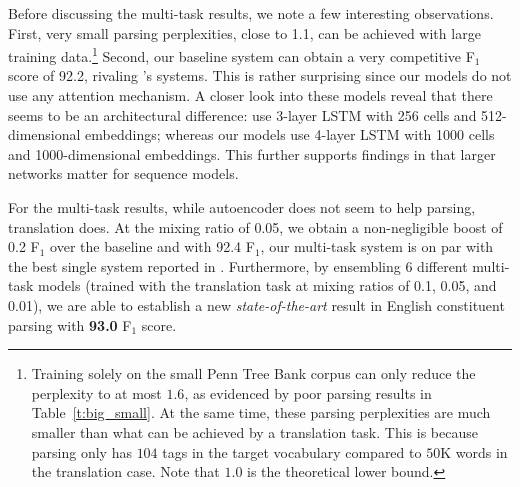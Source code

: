 Before discussing the multi-task results, we note a few interesting
observations. First, very small parsing perplexities, close to 1.1, can be achieved with large
training data.\footnote{Training solely on the small Penn Tree Bank
corpus can only reduce the perplexity to at most $1.6$, as evidenced by poor
parsing results in Table~\ref{t:big_small}. At the same time, these parsing
perplexities are much smaller than
what can be achieved by a translation task. This is because parsing only has
$104$ tags in the target vocabulary compared to
$50$K words in the translation case. Note that $1.0$ is the theoretical
lower bound.}  
Second, our baseline system can obtain a very competitive F$_1$ score of
92.2, rivaling \citet{vinyals15grammar}'s systems. This is rather surprising
since our models do not use any attention mechanism. A closer look into these
models reveal that there seems to be an architectural difference:
\citet{vinyals15grammar} use 3-layer LSTM with 256 cells and
512-dimensional embeddings; whereas our models use 4-layer LSTM with 1000 cells and
1000-dimensional embeddings. This further supports findings in \citep{rafal16} that
larger networks matter for sequence models.

For the multi-task results, while autoencoder does not seem to help parsing,
translation does. At the mixing ratio of 0.05, we obtain a non-negligible boost of 0.2 F$_1$ 
over the baseline and with 92.4 F$_1$, our multi-task system is on par with the best single system reported in
\citep{vinyals15grammar}. Furthermore, by ensembling 6 different multi-task
models (trained with the translation task at mixing ratios of
0.1, 0.05, and 0.01), we are able to establish a new {\it state-of-the-art} result in
English constituent parsing with {\bf 93.0} F$_1$ score.

